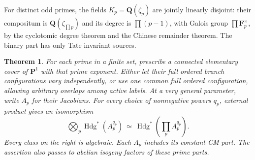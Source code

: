 \documentclass[11pt]{article}
\newtheorem{theorem}{Theorem}[section]
\theoremstyle{definition}
\newcommand{\Q}{\mathbf Q}
\newcommand{\F}{\mathbf F}
\newcommand{\Hdg}{\operatorname{Hdg}}
\begin{document}
For distinct odd primes, the fields $K_p=\Q(\zeta_p)$ are jointly
linearly disjoint: their compositum is $\Q(\zeta_{\prod p})$ and its
degree is $\prod(p-1)$, with Galois group $\prod\F_p^\times$, by
the cyclotomic degree theorem and the Chinese remainder theorem.
The binary part has only Tate invariant sources.

\begin{theorem}\label{thm:products}
For each prime in a finite set, prescribe a connected elementary cover of
$\mathbf P^1$ with that prime exponent. Either let their full ordered
branch configurations vary independently, or use one common full ordered
configuration, allowing arbitrary overlaps among active labels. At a
very general parameter, write $A_p$ for their Jacobians. For every choice
of nonnegative powers $q_p$, external product gives an isomorphism
\[
 \bigotimes_p\Hdg^*(A_p^{q_p})
                  \ \simeq\ \Hdg^*\left(\prod_p A_p^{q_p}\right).
\]
Every class on the right is algebraic. Each $A_p$ includes its constant
CM part. The assertion also passes to abelian isogeny factors of these
prime parts.
\end{theorem}
\end{document}
